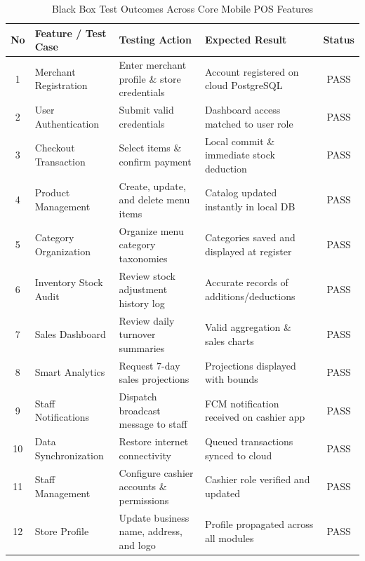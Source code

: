 \documentclass[10pt,a4paper]{article}
\begin{document}
\begin{table}[htbp]
  \centering
  \caption{Black Box Test Outcomes Across Core Mobile POS Features}
  \label{tab:blackbox}
  \fontsize{8pt}{10pt}\selectfont
  \begin{tabularx}{\textwidth}{clXXc}
    \toprule
    \textbf{No} & \textbf{Feature / Test Case} & \textbf{Testing Action} & \textbf{Expected Result} & \textbf{Status} \\
    \midrule
    1 & Merchant Registration & Enter merchant profile \& store credentials & Account registered on cloud PostgreSQL & PASS \\
    2 & User Authentication   & Submit valid credentials                    & Dashboard access matched to user role & PASS \\
    3 & Checkout Transaction  & Select items \& confirm payment             & Local commit \& immediate stock deduction & PASS \\
    4 & Product Management    & Create, update, and delete menu items       & Catalog updated instantly in local DB & PASS \\
    5 & Category Organization & Organize menu category taxonomies          & Categories saved and displayed at register & PASS \\
    6 & Inventory Stock Audit & Review stock adjustment history log         & Accurate records of additions/deductions & PASS \\
    7 & Sales Dashboard       & Review daily turnover summaries             & Valid aggregation \& sales charts & PASS \\
    8 & Smart Analytics       & Request 7-day sales projections             & Projections displayed with bounds & PASS \\
    9 & Staff Notifications   & Dispatch broadcast message to staff         & FCM notification received on cashier app & PASS \\
    10& Data Synchronization  & Restore internet connectivity               & Queued transactions synced to cloud & PASS \\
    11& Staff Management      & Configure cashier accounts \& permissions   & Cashier role verified and updated & PASS \\
    12& Store Profile         & Update business name, address, and logo     & Profile propagated across all modules & PASS \\
    \bottomrule
  \end{tabularx}
\end{table}
\end{document}
